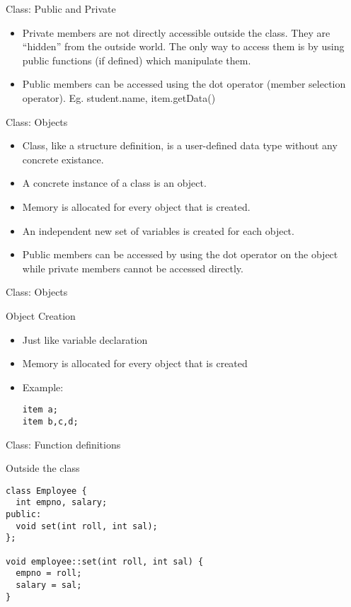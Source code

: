 \documentclass{beamer}
\begin{document}
\begin{frame}[fragile]{Class: Public and Private}
  \begin{itemize}
  \item Private members are not directly accessible outside the class. They are ``hidden'' from the outside world. The only way to access them is by using public functions (if defined) which manipulate them.\pause
  \item Public members can be accessed using the dot operator (member selection operator). Eg. student.name, item.getData()
  \end{itemize}
\end{frame}

\begin{frame}[fragile]{Class: Objects}
  \begin{itemize}
  \item Class, like a structure definition, is a user-defined data type without any concrete existance.\pause
  \item A concrete instance of a class is an object.\pause
  \item Memory is allocated for every object that is created.\pause
  \item An independent new set of variables is created for each object.\pause
  \item Public members can be accessed by using the dot operator on the object while private members cannot be accessed directly.
  \end{itemize}
\end{frame}

\begin{frame}[fragile]{Class: Objects}
  \begin{block}{Object Creation}\pause
    \begin{itemize}
    \item Just like variable declaration\pause
    \item Memory is allocated for every object that is created\pause
    \item Example:
      \begin{lstlisting}
item a;
item b,c,d;
      \end{lstlisting}
    \end{itemize}
  \end{block}
\end{frame}

\begin{frame}[fragile]{Class: Function definitions}
  \begin{block}{Outside the class}\pause
    \begin{lstlisting}
class Employee {
  int empno, salary;
public:
  void set(int roll, int sal);
};

void employee::set(int roll, int sal) {
  empno = roll;
  salary = sal;
}
    \end{lstlisting}
  \end{block}
\end{frame}
\end{document}
